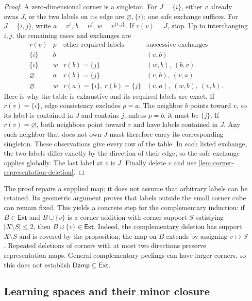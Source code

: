 \documentclass[11pt]{article}
\theoremstyle{definition}
\newcommand{\Damp}{\mathsf{Damp}}
\begin{document}
\begin{proof}
A zero-dimensional corner is a singleton. For $J=\{i\}$, either $v$
already owns $J$, or the two labels on its edge are $\varnothing,\{i\}$;
one safe exchange suffices.
For $J=\{i,j\}$, write $a=v^i$, $b=v^j$, $w=v^{\{i,j\}}$.
If $r(v)=J$, stop. Up to interchanging $i,j$, the remaining cases and
exchanges are
\[
\begin{array}{c|c|c|l}
 r(v)&p&\text{other required labels}&\text{successive exchanges}\\\hline
 \{i\}&b& & (v,b)\\
 \{i\}&w&r(b)=\{j\}&(w,b),\ (b,v)\\
 \varnothing&a&r(b)=\{j\}&(v,b),\ (v,a)\\
 \varnothing&w&r(a)=\{i\},\ r(b)=\{j\}&(v,a),\ (w,b),\ (v,b).
\end{array}
\]
Here is why the table is exhaustive and its required labels are exact.
If $r(v)=\{i\}$, edge consistency excludes $p=a$. The neighbor $b$
points toward $v$, so its label is contained in $J$ and contains $j$;
unless $p=b$, it must be $\{j\}$. If $r(v)=\varnothing$, both neighbors
point toward $v$ and have labels contained in $J$. Any such neighbor
that does not own $J$ must therefore carry its corresponding singleton.
These observations give every row of the table. In each listed exchange,
the two labels differ exactly by the direction of their edge, so the safe
exchange applies globally. The last label at $v$ is $J$. Finally delete
$v$ and use \cref{lem:corner-representation-deletion}.
\end{proof}

The proof repairs a supplied map; it does not assume that arbitrary labels
can be retained. Its geometric argument proves that labels outside the
small corner cube can remain fixed. This yields a concrete step for the
complementary induction: if $B\in\mathsf{Ext}$ and $B\cup\{v\}$ is a
corner addition with corner support $S$ satisfying $|X\setminus S|\le2$,
then $B\cup\{v\}\in\mathsf{Ext}$. Indeed, the complementary deletion
has support $X\setminus S$ and is covered by the proposition; the map on
$B$ extends by assigning $v\mapsto S$. Repeated deletions of corners with
at most two directions preserve representation maps. General complementary
peelings can have larger corners, so this does not establish
$\Damp\subseteq\mathsf{Ext}$.

\subsection{Learning spaces and their minor closure}
\end{document}
